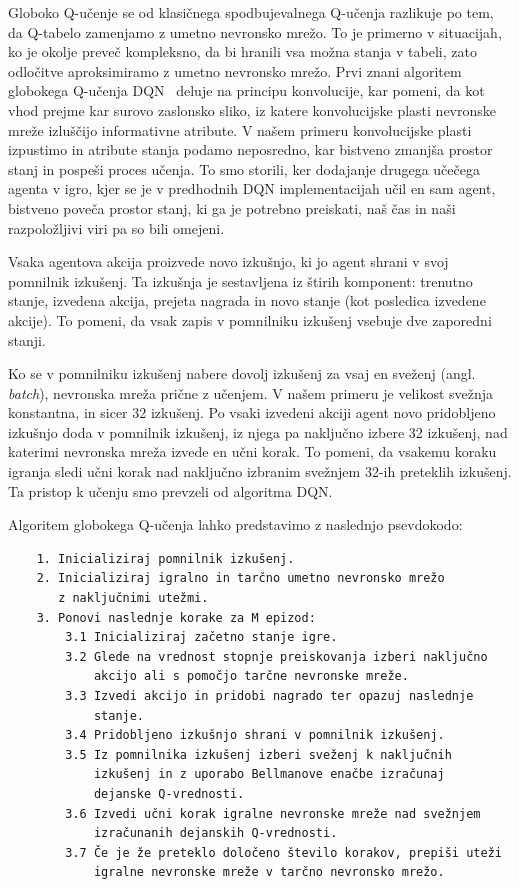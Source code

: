 \documentclass[cover]{thesis}
\begin{document}
Globoko Q-učenje se od klasičnega spodbujevalnega Q-učenja razlikuje po tem, da Q-tabelo zamenjamo z umetno nevronsko mrežo. To je primerno v situacijah, ko je okolje preveč kompleksno, da bi hranili vsa možna stanja v tabeli, zato odločitve aproksimiramo z umetno nevronsko mrežo. Prvi znani algoritem globokega Q-učenja DQN~\cite{mnih2013playing} deluje na principu konvolucije, kar pomeni, da kot vhod prejme kar surovo zaslonsko sliko, iz katere konvolucijske plasti nevronske mreže izluščijo informativne atribute. V našem primeru konvolucijske plasti izpustimo in atribute stanja podamo neposredno, kar bistveno zmanjša prostor stanj in pospeši proces učenja. To smo storili, ker dodajanje drugega učečega agenta v igro, kjer se je v predhodnih DQN implementacijah učil en sam agent, bistveno poveča prostor stanj, ki ga je potrebno preiskati, naš čas in naši razpoložljivi viri pa so bili omejeni.

Vsaka agentova akcija proizvede novo izkušnjo, ki jo agent shrani v svoj pomnilnik izkušenj.
Ta izkušnja je sestavljena iz štirih komponent: trenutno stanje, izvedena akcija, prejeta nagrada in novo stanje (kot posledica izvedene akcije). To pomeni, da vsak zapis v pomnilniku izkušenj vsebuje dve zaporedni stanji.

Ko se v pomnilniku izkušenj nabere dovolj izkušenj za vsaj en sveženj (angl. \emph{batch}), nevronska mreža prične z učenjem. V našem primeru je velikost svežnja konstantna, in sicer 32 izkušenj. Po vsaki izvedeni akciji agent novo pridobljeno izkušnjo doda v pomnilnik izkušenj, iz njega pa naključno izbere 32 izkušenj, nad katerimi nevronska mreža izvede en učni korak. To pomeni, da vsakemu koraku igranja sledi učni korak nad naključno izbranim svežnjem 32-ih preteklih izkušenj. Ta pristop k učenju smo prevzeli od algoritma DQN.

Algoritem globokega Q-učenja lahko predstavimo z naslednjo psevdokodo:
\begin{verbatim}        
    1. Inicializiraj pomnilnik izkušenj.
    2. Inicializiraj igralno in tarčno umetno nevronsko mrežo
       z naključnimi utežmi.
    3. Ponovi naslednje korake za M epizod:
        3.1 Inicializiraj začetno stanje igre.
        3.2 Glede na vrednost stopnje preiskovanja izberi naključno
            akcijo ali s pomočjo tarčne nevronske mreže.
        3.3 Izvedi akcijo in pridobi nagrado ter opazuj naslednje
            stanje.
        3.4 Pridobljeno izkušnjo shrani v pomnilnik izkušenj.
        3.5 Iz pomnilnika izkušenj izberi sveženj k naključnih
            izkušenj in z uporabo Bellmanove enačbe izračunaj
            dejanske Q-vrednosti.
        3.6 Izvedi učni korak igralne nevronske mreže nad svežnjem
            izračunanih dejanskih Q-vrednosti.
        3.7 Če je že preteklo določeno število korakov, prepiši uteži
            igralne nevronske mreže v tarčno nevronsko mrežo.
\end{verbatim}
\end{document}
